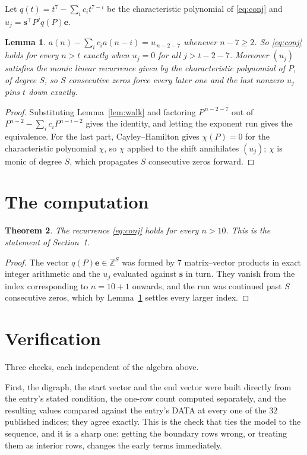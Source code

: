 \documentclass[11pt,a4paper]{article}
\theoremstyle{plain}
\newtheorem{theorem}{Theorem}
\newtheorem{lemma}[theorem]{Lemma}
\theoremstyle{definition}
\begin{document}
Let $q(t)=t^{7}-\sum_i c_i t^{7-i}$ be the characteristic polynomial of
\eqref{eq:conj} and $u_j=\mathbf{s}^{\!\top}P^{j}q(P)\mathbf{e}$.

\begin{lemma}\label{lem:crit}
$a(n)-\sum_i c_i a(n-i)=u_{\,n-2-7}$ whenever $n-7\ge2$. So \eqref{eq:conj}
holds for every $n>t$ exactly when $u_j=0$ for all $j>t-2-7$. Moreover $(u_j)$
satisfies the monic linear recurrence given by the characteristic polynomial of $P$, of
degree $S$, so $S$ consecutive zeros force every later one and the last nonzero $u_j$ pins
$t$ down exactly.
\end{lemma}

\begin{proof}
Substituting Lemma~\ref{lem:walk} and factoring $P^{\,n-2-7}$ out of
$P^{n-2}-\sum_i c_i P^{n-i-2}$ gives the identity, and letting the exponent run gives the
equivalence. For the last part, Cayley--Hamilton gives $\chi(P)=0$ for the characteristic
polynomial $\chi$, so $\chi$ applied to the shift annihilates $(u_j)$; $\chi$ is monic of
degree $S$, which propagates $S$ consecutive zeros forward.
\end{proof}

\section{The computation}

\begin{theorem}
The recurrence \eqref{eq:conj} holds for every $n>10$. This is the statement of
Section~1.
\end{theorem}

\begin{proof}
The vector $q(P)\mathbf{e}\in\mathbb{Z}^{S}$ was formed by $7$ matrix--vector
products in exact integer arithmetic and the $u_j$ evaluated against $\mathbf{s}$ in turn.
They vanish from the index corresponding to $n=10+1$ onwards, and the run was continued
past $S$ consecutive zeros, which by Lemma~\ref{lem:crit} settles every larger index.
\end{proof}

\section{Verification}

Three checks, each independent of the algebra above.

First, the digraph, the start vector and the end vector were built directly from the
entry's stated condition, the one-row count computed separately, and the resulting values
compared against the entry's DATA at every one of the $32$ published indices; they
agree exactly. This is the check that ties the model to the sequence, and it is a sharp one:
getting the boundary rows wrong, or treating them as interior rows, changes the early terms
immediately.
\end{document}

